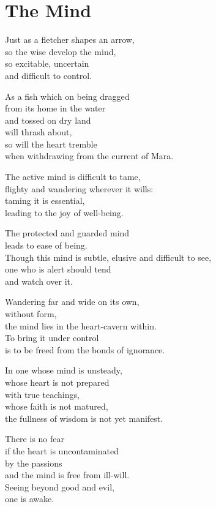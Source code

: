 
\chapter{The Mind}


Just as a fletcher shapes an arrow,\\
so the wise develop the mind,\\
so excitable, uncertain\\
and difficult to control.

As a fish which on being dragged\\
from its home in the water\\
and tossed on dry land\\
will thrash about,\\
so will the heart tremble\\
when withdrawing from the current of Mara.


The active mind is difficult to tame,\\
flighty and wandering wherever it wills:\\
taming it is essential,\\
leading to the joy of well-being.


The protected and guarded mind\\
leads to ease of being.\\
Though this mind is subtle, elusive and difficult to see,\\
one who is alert should tend\\
and watch over it.


Wandering far and wide on its own,\\
without form,\\
the mind lies in the heart-cavern within.\\
To bring it under control\\
is to be freed from the bonds of ignorance.


In one whose mind is unsteady,\\
whose heart is not prepared\\
with true teachings,\\
whose faith is not matured,\\
the fullness of wisdom is not yet manifest.


There is no fear\\
if the heart is uncontaminated\\
by the passions\\
and the mind is free from ill-will.\\
Seeing beyond good and evil,\\
one is awake.

